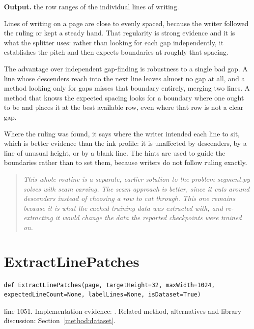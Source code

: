 \noindent\textbf{Output.} the row ranges of the individual lines of writing.


Lines of writing on a page are close to evenly spaced, because the writer followed the ruling or kept a steady hand. That regularity is strong evidence and it is what the splitter uses: rather than looking for each gap independently, it establishes the pitch and then expects boundaries at roughly that spacing.

The advantage over independent gap-finding is robustness to a single bad gap. A line whose descenders reach into the next line leaves almost no gap at all, and a method looking only for gaps misses that boundary entirely, merging two lines. A method that knows the expected spacing looks for a boundary where one ought to be and places it at the best available row, even where that row is not a clear gap.


Where the ruling was found, it says where the writer intended each line to sit, which is better evidence than the ink profile: it is unaffected by descenders, by a line of unusual height, or by a blank line. The hints are used to guide the boundaries rather than to set them, because writers do not follow ruling exactly.


\begin{quote}\small\itshape This whole routine is a separate, earlier solution to the problem segment.py solves with seam carving. The seam approach is better, since it cuts around descenders instead of choosing a row to cut through. This one remains because it is what the cached training data was extracted with, and re-extracting it would change the data the reported checkpoints were trained on.\end{quote}


\section{ExtractLinePatches}\label{fn:train:ExtractLinePatches}
\begin{lstlisting}[style=sig]
def ExtractLinePatches(page, targetHeight=32, maxWidth=1024, expectedLineCount=None, labelLines=None, isDataset=True)
\end{lstlisting}
 line 1051. Implementation evidence: \cite{code2026}. Related method, alternatives and library discussion: Section~\ref{method:dataset}.


